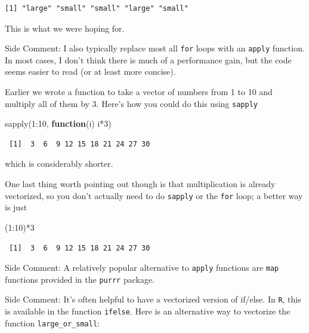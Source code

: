 \documentclass[
  letterpaper,
  DIV=11,
  numbers=noendperiod]{scrreprt}
\newenvironment{Shaded}{\begin{snugshade}}{\end{snugshade}}
\newcommand{\ControlFlowTok}[1]{\textcolor[rgb]{0.00,0.23,0.31}{\textbf{#1}}}
\newcommand{\DecValTok}[1]{\textcolor[rgb]{0.68,0.00,0.00}{#1}}
\newcommand{\FunctionTok}[1]{\textcolor[rgb]{0.28,0.35,0.67}{#1}}
\newcommand{\NormalTok}[1]{\textcolor[rgb]{0.00,0.23,0.31}{#1}}
\newcommand{\SpecialCharTok}[1]{\textcolor[rgb]{0.37,0.37,0.37}{#1}}
\begin{document}
\begin{verbatim}
[1] "large" "small" "small" "large" "small"
\end{verbatim}

This is what we were hoping for.

{Side Comment:} I also typically replace most all \texttt{for} loops
with an \texttt{apply} function. In most cases, I don't think there is
much of a performance gain, but the code seems easier to read (or at
least more concise).

Earlier we wrote a function to take a vector of numbers from 1 to 10 and
multiply all of them by 3. Here's how you could do this using
\texttt{sapply}

\begin{Shaded}
\begin{Highlighting}[]
\FunctionTok{sapply}\NormalTok{(}\DecValTok{1}\SpecialCharTok{:}\DecValTok{10}\NormalTok{, }\ControlFlowTok{function}\NormalTok{(i) i}\SpecialCharTok{*}\DecValTok{3}\NormalTok{)}
\end{Highlighting}
\end{Shaded}

\begin{verbatim}
 [1]  3  6  9 12 15 18 21 24 27 30
\end{verbatim}

which is considerably shorter.

One last thing worth pointing out though is that multiplication is
already vectorized, so you don't actually need to do \texttt{sapply} or
the \texttt{for} loop; a better way is just

\begin{Shaded}
\begin{Highlighting}[]
\NormalTok{(}\DecValTok{1}\SpecialCharTok{:}\DecValTok{10}\NormalTok{)}\SpecialCharTok{*}\DecValTok{3}
\end{Highlighting}
\end{Shaded}

\begin{verbatim}
 [1]  3  6  9 12 15 18 21 24 27 30
\end{verbatim}

{Side Comment:} A relatively popular alternative to \texttt{apply}
functions are \texttt{map} functions provided in the \texttt{purrr}
package.

{Side Comment:} It's often helpful to have a vectorized version of
if/else. In \texttt{R}, this is available in the function
\texttt{ifelse}. Here is an alternative way to vectorize the function
\texttt{large\_or\_small}:
\end{document}
